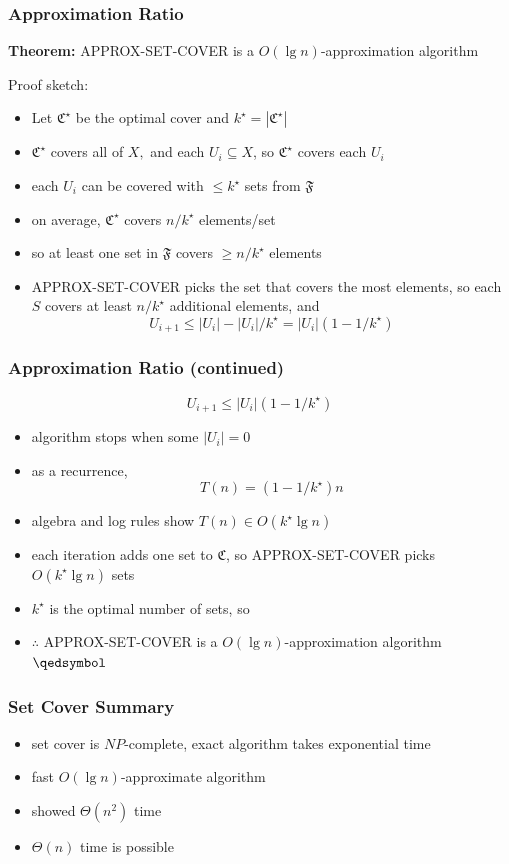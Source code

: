 \documentclass{beamer}
\begin{document}
\begin{frame} \frametitle{Approximation Ratio}
\textbf{Theorem:} APPROX-SET-COVER is a $O(\lg n)$-approximation algorithm

Proof sketch:
\begin{itemize}
  \item Let $\mathfrak{C}^\star$ be the optimal cover and $k^\star=|\mathfrak{C}^\star|$
  \item $\mathfrak{C}^\star$ covers all of $X,$ and each $U_i \subseteq X$, so $\mathfrak{C}^\star$ covers each $U_i$
  \item each $U_i$ can be covered with $\leq k^\star$ sets from $\mathfrak{F}$
  \item on average, $\mathfrak{C}^\star$ covers $n/k^\star$ elements/set
  \item so at least one set in $\mathfrak{F}$ covers $\geq n/k^\star$ elements
  \item APPROX-SET-COVER picks the set that covers the most elements, so each $S$ covers at least $n/k^\star$ additional elements,
    and \[ U_{i+1} \leq |U_i| - |U_i|/k^\star = |U_i|(1-1/k^\star) \]
\end{itemize}
\end{frame}

\begin{frame} \frametitle{Approximation Ratio (continued)}
  \[ U_{i+1} \leq |U_i|(1-1/k^\star) \]
  \begin{itemize}
    \item algorithm stops when some $|U_i|=0$
    \item as a recurrence,
      \[ T(n) = (1-1/k^\star)n \]
    \item algebra and log rules show $T(n) \in O(k^\star \lg n)$
    \item each iteration adds one set to $\mathfrak{C}$, so APPROX-SET-COVER picks $O(k^\star \lg n)$ sets
    \item $k^\star$ is the optimal number of sets, so
    \item $\therefore$ APPROX-SET-COVER is a $O(\lg n)$-approximation algorithm $\qedsymbol$
  \end{itemize}
  \end{frame}
  
\begin{frame} \frametitle{Set Cover Summary}
\begin{itemize}
  \item set cover is $NP$-complete, exact algorithm takes exponential time
  \item fast $O(\lg n)$-approximate algorithm
  \item showed $\Theta(n^2)$ time
  \item $\Theta(n)$ time is possible
\end{itemize}
\end{frame}
\end{document}
